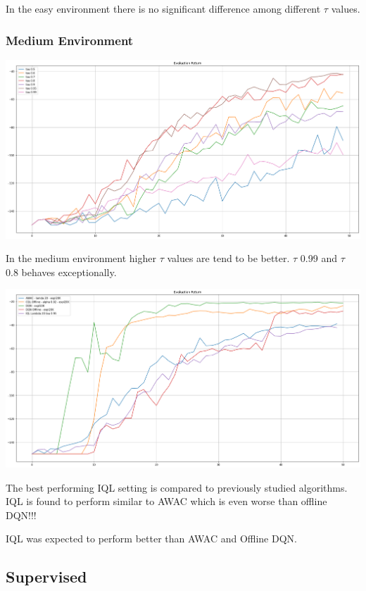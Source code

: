 \documentclass[11pt]{article}
\begin{document}
    In the easy environment there is no significant difference among different $\tau$ values.

    \subsubsection{Medium Environment}

    \hspace*{-0.3in}
    \includegraphics[scale=0.30]{q5/eval-medium-unsupervised}

    In the medium environment higher $\tau$ values are tend to be better.
    $\tau$ 0.99 and $\tau$ 0.8 behaves exceptionally.

    \hspace*{-0.3in}
    \includegraphics[scale=0.30]{q5/eval-medium-unsupervised-compared}

    The best performing IQL setting is compared to previously studied algorithms.
    IQL is found to perform similar to AWAC which is even worse than offline DQN!!!

    IQL was expected to perform better than AWAC and Offline DQN.

    \subsection{Supervised}
\end{document}
